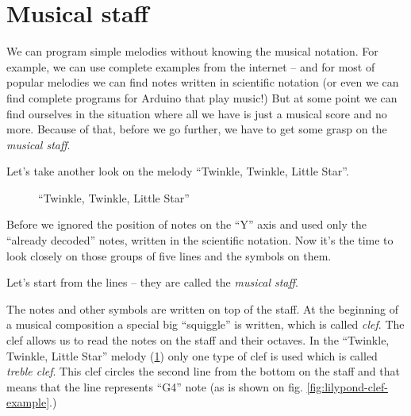\documentclass[../sparc.tex]{subfiles}
\begin{document}
\newpage
\section{Musical staff}

We can program simple melodies without knowing the musical notation.  For
example, we can use complete examples from the internet -- and for most of
popular melodies we can find notes written in scientific notation (or even we
can find complete programs for Arduino that play music!)  But at some point we
can find ourselves in the situation where all we have is just a musical score
and no more.  Because of that, before we go further, we have to get some grasp
on the \emph{musical staff}.

Let's take another look on the melody ``Twinkle, Twinkle, Little Star''.

\begin{figure}[ht]
  \centering
  \label{fig:sound-fig-4}
  \caption{``Twinkle, Twinkle, Little Star''}
\end{figure}

Before we ignored the position of notes on the ``Y'' axis and used only the
``already decoded'' notes, written in the scientific notation.  Now it's the
time to look closely on those groups of five lines and the symbols on them.

Let's start from the lines -- they are called the \emph{musical staff}.

 The notes and other symbols are written on top of the
staff.  At the beginning of a musical composition a special big ``squiggle'' is
written, which is called \emph{clef}.  The clef allows us to read the notes on
the staff and their octaves.  In the ``Twinkle, Twinkle, Little Star'' melody
(\ref{fig:sound-fig-4}) only one type of clef is used which is called
\emph{treble clef}.  This clef circles the second line from the bottom on the
staff and that means that the line represents ``G4'' note (as is shown on fig.
\ref{fig:lilypond-clef-example}.)
\end{document}
